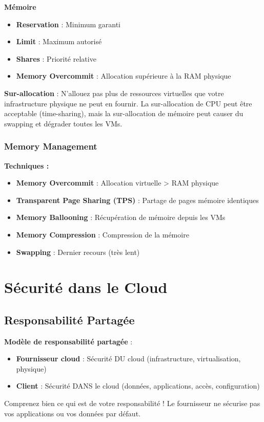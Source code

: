 \documentclass[11pt,a4paper]{article}
\begin{document}
\textbf{Mémoire}
\begin{itemize}
    \item \textbf{Reservation} : Minimum garanti
    \item \textbf{Limit} : Maximum autorisé
    \item \textbf{Shares} : Priorité relative
    \item \textbf{Memory Overcommit} : Allocation supérieure à la RAM physique
\end{itemize}

\begin{dangerbox}
\textbf{Sur-allocation} : N'allouez pas plus de ressources virtuelles que votre infrastructure physique ne peut en fournir. La sur-allocation de CPU peut être acceptable (time-sharing), mais la sur-allocation de mémoire peut causer du swapping et dégrader toutes les VMs.
\end{dangerbox}

\subsubsection{Memory Management}

\textbf{Techniques :}
\begin{itemize}
    \item \textbf{Memory Overcommit} : Allocation virtuelle > RAM physique
    \item \textbf{Transparent Page Sharing (TPS)} : Partage de pages mémoire identiques
    \item \textbf{Memory Ballooning} : Récupération de mémoire depuis les VMs
    \item \textbf{Memory Compression} : Compression de la mémoire
    \item \textbf{Swapping} : Dernier recours (très lent)
\end{itemize}

\section{Sécurité dans le Cloud}

\subsection{Responsabilité Partagée}

\begin{importantbox}
\textbf{Modèle de responsabilité partagée} : 
\begin{itemize}
    \item \textbf{Fournisseur cloud} : Sécurité DU cloud (infrastructure, virtualisation, physique)
    \item \textbf{Client} : Sécurité DANS le cloud (données, applications, accès, configuration)
\end{itemize}
Comprenez bien ce qui est de votre responsabilité ! Le fournisseur ne sécurise pas vos applications ou vos données par défaut.
\end{importantbox}
\end{document}
